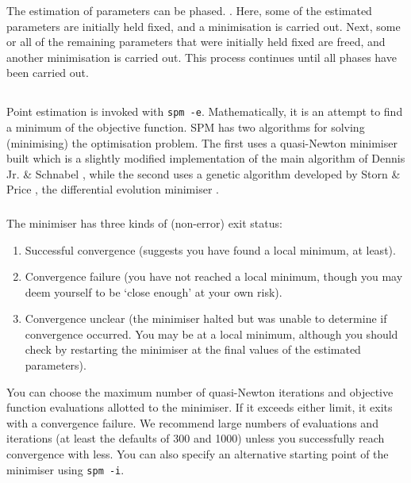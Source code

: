 The estimation of parameters can be phased. \NYI. Here, some of the estimated parameters are initially held fixed, and a minimisation is carried out. Next, some or all of the remaining parameters that were initially held fixed are freed, and another minimisation is carried out. This process continues until all phases have been carried out.

\subsection{\label{sec:estimate-MPD}}

Point estimation is invoked with \texttt{spm -e}. Mathematically, it is an attempt to find a minimum of the objective function. SPM has two algorithms for solving (minimising) the optimisation problem. The first uses a quasi-Newton minimiser built which is a slightly modified implementation of the main algorithm of Dennis Jr. \& Schnabel \citep{779}, while the second uses a genetic algorithm developed by Storn \& Price \citep{1442}, the differential evolution minimiser .

\subsubsection{}

The minimiser has three kinds of (non-error) exit status: 

\begin{enumerate}
\item Successful convergence (suggests you have found a local minimum, at least).
\item Convergence failure (you have not reached a local minimum, though you may deem yourself to be `close enough' at your own risk).
\item Convergence unclear (the minimiser halted but was unable to determine if convergence occurred. You may be at a local minimum, although you should check by restarting the minimiser at the final values of the estimated parameters).
\end{enumerate}

You can choose the maximum number of quasi-Newton iterations and objective function evaluations allotted to the minimiser. If it exceeds either limit, it exits with a convergence failure. We recommend large numbers of evaluations and iterations (at least the defaults of 300 and 1000) unless you successfully reach convergence with less. You can also specify an alternative starting point of the minimiser using \texttt{spm -i}.

